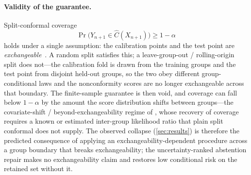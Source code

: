 \documentclass[pdflatex,sn-mathphys-num]{sn-jnl}
\begin{document}
\paragraph{Validity of the guarantee.} Split-conformal coverage
\begin{equation}
\label{eq:cp-guarantee}
\Pr\!\big(Y_{n+1}\in\hat C(X_{n+1})\big)\ge 1-\alpha
\end{equation}
holds under a single assumption: the calibration points
and the test point are \emph{exchangeable}~\citep{vovk2005algorithmic,lei2018distribution}. A random split
satisfies this; a leave-group-out / rolling-origin split does not---the calibration fold is drawn from the
training groups and the test point from disjoint held-out groups, so the two obey different group-conditional
laws and the nonconformity scores are no longer exchangeable across that boundary. The finite-sample guarantee
is then void, and coverage can fall below $1-\alpha$ by the amount the score distribution shifts between
groups---the covariate-shift / beyond-exchangeability regime of \citet{tibshirani2019covariate,barber2023beyond},
whose recovery of coverage requires a known or estimated inter-group likelihood ratio that plain split conformal
does not supply. The observed collapse (\cref{sec:results}) is therefore the predicted consequence of
applying an exchangeability-dependent procedure across a group boundary that breaks exchangeability; the
uncertainty-ranked abstention repair makes no exchangeability claim and restores low conditional risk on
the retained set without it.
\end{document}
